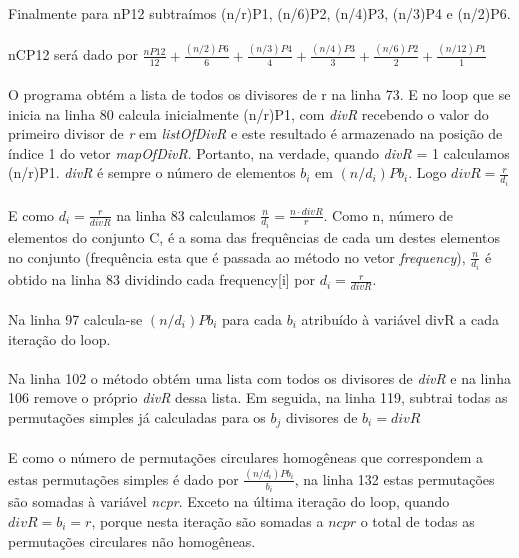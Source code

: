 \documentclass[a4paper,12pt,openany]{book}
\begin{document}
\\
\\
Finalmente para nP12 subtraímos (n/r)P1, (n/6)P2, (n/4)P3, (n/3)P4 e (n/2)P6.
\\
\\
nCP12 será dado por $ \frac{nP12}{12} + \frac{(n/2)P6}{6} + \frac{(n/3)P4}{4} + \frac{(n/4)P3}{3} + \frac{(n/6)P2}{2} + \frac{(n/12)P1}{1}$
\\
\\
O programa obtém a lista de todos os divisores de r na linha 73. E no loop que se inicia na linha 80 calcula inicialmente (n/r)P1, com \textit{divR} recebendo o valor do primeiro divisor de \textit{r} em\textit{ listOfDivR} e este resultado é armazenado na posição de índice 1 do vetor \textit{mapOfDivR}. Portanto, na verdade, quando \textit{divR} = 1 calculamos (n/r)P1. \textit{divR} é sempre o número de elementos $ b_i $ em $ (n/d_i)Pb_i $. Logo $ divR = \frac{r}{d_i} $
\\
\\
E como $ d_i = \frac{r}{divR} $ na linha 83 calculamos $ \frac{n}{d_i} = \frac{n \cdot divR}{r} $. Como n, número de elementos do conjunto C, é a soma das frequências de cada um destes elementos no conjunto (frequência esta que é passada ao método no vetor \textit{frequency}), $ \frac{n}{d_i} $ é obtido na linha 83 dividindo cada frequency[i] por $ d_i = \frac {r}{divR} $.
\\
\\
Na linha 97 calcula-se $ (n/d_i)Pb_i $ para cada $ b_i $ atribuído à variável divR a cada iteração do loop.
\\
\\
Na linha 102 o método obtém uma lista com todos os divisores de \textit{divR} e na linha 106 remove o próprio \textit{divR} dessa lista. Em seguida, na linha 119, subtrai todas as permutações simples já calculadas para os $ b_j $ divisores de $ b_i = divR $
\\
\\
E como o número de permutações circulares homogêneas que correspondem a estas permutações simples é dado por $ \frac{(n/d_i)Pb_i}{b_i} $, na linha 132 estas permutações são somadas à variável \textit{ncpr}. Exceto na última iteração do loop, quando $ divR = b_i = r $, porque nesta iteração são somadas a $ ncpr $ o total de todas as permutações circulares não homogêneas.
\\
\\
\end{document}
